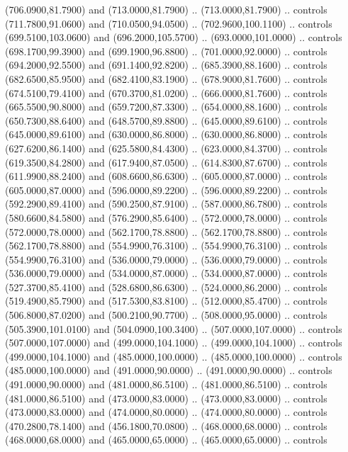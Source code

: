 {\begin{scope}[y=0.80pt, x=0.80pt, yscale=-1, xscale=1, inner sep=0pt, outer sep=0pt, #1]
      (706.0900,81.7900) and (713.0000,81.7900) .. (713.0000,81.7900) .. controls
      (711.7800,91.0600) and (710.0500,94.0500) .. (702.9600,100.1100) .. controls
      (699.5100,103.0600) and (696.2000,105.5700) .. (693.0000,101.0000) .. controls
      (698.1700,99.3900) and (699.1900,96.8800) .. (701.0000,92.0000) .. controls
      (694.2000,92.5500) and (691.1400,92.8200) .. (685.3900,88.1600) .. controls
      (682.6500,85.9500) and (682.4100,83.1900) .. (678.9000,81.7600) .. controls
      (674.5100,79.4100) and (670.3700,81.0200) .. (666.0000,81.7600) .. controls
      (665.5500,90.8000) and (659.7200,87.3300) .. (654.0000,88.1600) .. controls
      (650.7300,88.6400) and (648.5700,89.8800) .. (645.0000,89.6100) .. controls
      (645.0000,89.6100) and (630.0000,86.8000) .. (630.0000,86.8000) .. controls
      (627.6200,86.1400) and (625.5800,84.4300) .. (623.0000,84.3700) .. controls
      (619.3500,84.2800) and (617.9400,87.0500) .. (614.8300,87.6700) .. controls
      (611.9900,88.2400) and (608.6600,86.6300) .. (605.0000,87.0000) .. controls
      (605.0000,87.0000) and (596.0000,89.2200) .. (596.0000,89.2200) .. controls
      (592.2900,89.4100) and (590.2500,87.9100) .. (587.0000,86.7800) .. controls
      (580.6600,84.5800) and (576.2900,85.6400) .. (572.0000,78.0000) .. controls
      (572.0000,78.0000) and (562.1700,78.8800) .. (562.1700,78.8800) .. controls
      (562.1700,78.8800) and (554.9900,76.3100) .. (554.9900,76.3100) .. controls
      (554.9900,76.3100) and (536.0000,79.0000) .. (536.0000,79.0000) .. controls
      (536.0000,79.0000) and (534.0000,87.0000) .. (534.0000,87.0000) .. controls
      (527.3700,85.4100) and (528.6800,86.6300) .. (524.0000,86.2000) .. controls
      (519.4900,85.7900) and (517.5300,83.8100) .. (512.0000,85.4700) .. controls
      (506.8000,87.0200) and (500.2100,90.7700) .. (508.0000,95.0000) .. controls
      (505.3900,101.0100) and (504.0900,100.3400) .. (507.0000,107.0000) .. controls
      (507.0000,107.0000) and (499.0000,104.1000) .. (499.0000,104.1000) .. controls
      (499.0000,104.1000) and (485.0000,100.0000) .. (485.0000,100.0000) .. controls
      (485.0000,100.0000) and (491.0000,90.0000) .. (491.0000,90.0000) .. controls
      (491.0000,90.0000) and (481.0000,86.5100) .. (481.0000,86.5100) .. controls
      (481.0000,86.5100) and (473.0000,83.0000) .. (473.0000,83.0000) .. controls
      (473.0000,83.0000) and (474.0000,80.0000) .. (474.0000,80.0000) .. controls
      (470.2800,78.1400) and (456.1800,70.0800) .. (468.0000,68.0000) .. controls
      (468.0000,68.0000) and (465.0000,65.0000) .. (465.0000,65.0000) .. controls

\end{scope}}
